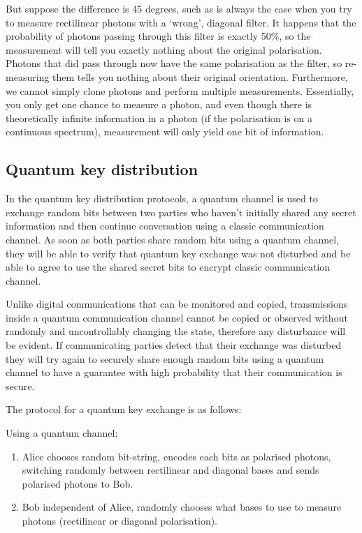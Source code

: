 \documentclass[oneside,a4paper]{article}
\begin{document}
But suppose the difference is 45 degrees, such as is always the case when you try to measure rectilinear photons with a `wrong', diagonal filter.
It happens that the probability of photons passing through this filter is exactly 50\%, so the measurement will tell you exactly nothing about the original polarisation.
Photons that did pass through now have the same polarisation as the filter, so re-measuring them tells you nothing about their original orientation.
Furthermore, we cannot simply clone photons and perform multiple measurements.
Essentially, you only get one chance to measure a photon, and even though there is theoretically infinite information in a photon (if the polarisation is on a continuous spectrum), measurement will only yield one bit of information.

\subsection{Quantum key distribution}
In the quantum key distribution protocols, a quantum channel is used to exchange random bits between two parties who haven't initially shared any secret information and then continue conversation using a classic communication channel. As soon as both parties share random bits using a quantum channel, they will be able to verify that quantum key exchange was not disturbed and be able to agree to use the shared secret bits to encrypt classic communication channel.

Unlike digital communications that can be monitored and copied, transmissions inside a quantum communication channel cannot be copied or observed without randomly and uncontrollably changing the state, therefore any disturbance will be evident. If communicating parties detect that their exchange was disturbed they will try again to securely share enough random bits using a quantum channel to have a guarantee with high probability that their communication is secure.


The protocol for a quantum key exchange is as follows:

Using a quantum channel:
\begin{enumerate}
    \item Alice chooses random bit-string, encodes each bits as polarised photons, switching randomly between rectilinear and diagonal bases and sends polarised photons to Bob.
    \item Bob independent of Alice, randomly chooses what bases to use to measure photons (rectilinear or diagonal polarisation).
\end{enumerate}
\end{document}
